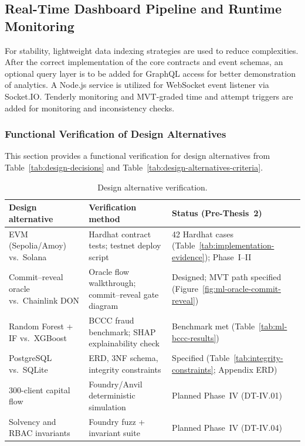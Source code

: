 \subsection{Real-Time Dashboard Pipeline and Runtime Monitoring}
\label{sec:realtime}

For stability, lightweight data indexing strategies are used to reduce complexities. After the correct implementation of the core contracts and event schemas, an optional query layer is to be added for GraphQL access for better demonstration of analytics. A Node.js service is utilized for WebSocket event listener via Socket.IO. Tenderly monitoring and MVT-graded time and attempt triggers are added for monitoring and inconsistency checks.



\subsubsection{Functional Verification of Design Alternatives}
\label{sec:design-alternative-verification}

This section provides a functional verification for design alternatives from Table~\ref{tab:design-decisions} and Table~\ref{tab:design-alternatives-criteria}.

\begin{table}[H]
\centering
\caption[Design alternative verification]{Design alternative verification.}
\label{tab:design-alternative-verification}
\small
\begin{tabular}{@{}p{3.4cm}p{4.2cm}p{6.0cm}@{}}
\toprule
\tableheadcolor
\textbf{Design alternative} & \textbf{Verification method} & \textbf{Status (Pre-Thesis~2)} \\
\midrule
EVM (Sepolia/Amoy) vs.\ Solana & Hardhat contract tests; testnet deploy script & 42 Hardhat cases (Table~\ref{tab:implementation-evidence}); Phase~I--II \\
Commit--reveal oracle vs.\ Chainlink DON & Oracle flow walkthrough; commit--reveal gate diagram & Designed; MVT path specified (Figure~\ref{fig:ml-oracle-commit-reveal}) \\
Random Forest + IF vs.\ XGBoost & BCCC fraud benchmark; SHAP explainability check & Benchmark met (Table~\ref{tab:ml-bccc-results}) \\
PostgreSQL vs.\ SQLite & ERD, 3NF schema, integrity constraints & Specified (Table~\ref{tab:integrity-constraints}; Appendix ERD) \\
300-client capital flow & Foundry/Anvil deterministic simulation & Planned Phase~IV (DT-IV.01) \\
Solvency and RBAC invariants & Foundry fuzz + invariant suite & Planned Phase~IV (DT-IV.04) \\
\bottomrule
\end{tabular}
\end{table}




